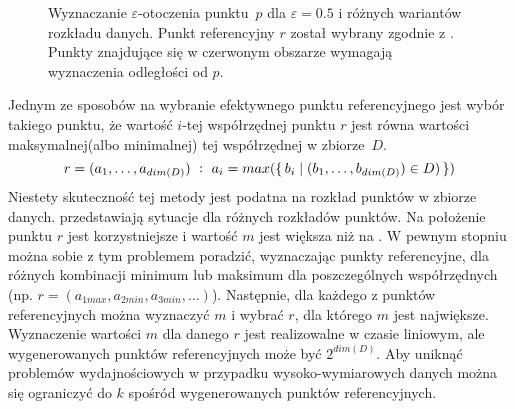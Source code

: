 \begin{figure}
\begin{minipage}[b]{.5\linewidth}
		\subcaption{}\label{img:ti-max-ref-bad}
	\end{minipage}
	\caption{Wyznaczanie $ \varepsilon $-otoczenia \mbox{punktu $ p $} dla $ \varepsilon =0.5 $ i różnych wariantów rozkładu danych. Punkt referencyjny $ r $ został wybrany zgodnie z . Punkty znajdujące się w czerwonym obszarze wymagają wyznaczenia odległości od $ p $.}\label{img:ti-max-ref}
\end{figure}

Jednym ze sposobów na wybranie efektywnego punktu referencyjnego jest wybór takiego punktu, że wartość $i $-tej współrzędnej punktu $ r $ jest równa wartości maksymalnej(albo minimalnej) tej współrzędnej w \mbox{zbiorze $ D $.}
\begin{equation}\label{eq:ti-max-ref}
	r=(a_1,\dots,a_{dim(D)})\ :\ a_i = max(\set{b_i | (b_1,\dots,b_{dim(D)}) \in D)})
\end{equation}
Niestety skuteczność tej metody jest podatna na rozkład punktów w zbiorze danych.  przedstawiają sytuacje dla różnych rozkładów punktów. Na  położenie punktu $ r $ jest korzystniejsze i wartość $ m $ jest większa niż na . W pewnym stopniu można sobie z tym problemem poradzić, wyznaczając punkty referencyjne, dla różnych kombinacji minimum lub maksimum dla poszczególnych współrzędnych (np. $ r=(a_{1max}, a_{2min}, a_{3min}, \dots) $). Następnie, dla każdego z punktów referencyjnych można wyznaczyć $ m $ i wybrać $ r $, dla którego $ m $ jest największe. Wyznaczenie wartości $ m $ dla danego $ r $ jest realizowalne w czasie liniowym, ale wygenerowanych punktów referencyjnych może być $ 2^{dim(D)} $. Aby uniknąć problemów wydajnościowych w przypadku wysoko-wymiarowych danych można się ograniczyć do $ k $ spośród wygenerowanych punktów referencyjnych. 

